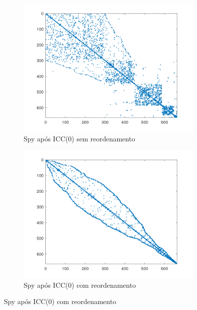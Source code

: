\begin{figure}[H]
    \centering
    \begin{subfigure}[t]{0.4\linewidth}
         \centering
         \includegraphics[width=\textwidth]{images/662_bus_spyM_ICC(0)_sem.png}
         \caption{Spy após ICC(0) sem reordenamento}
         \label{fig:bus-icc0-sem}
    \end{subfigure}
    \quad
    \begin{subfigure}[t]{0.4\linewidth}
         \centering
         \includegraphics[width=\textwidth]{images/662_bus_spyM_ICC(0)_com.png}
         \caption{Spy após ICC(0) com reordenamento}
         \label{fig:bus-icc0-com}
    \end{subfigure}

\end{figure}
